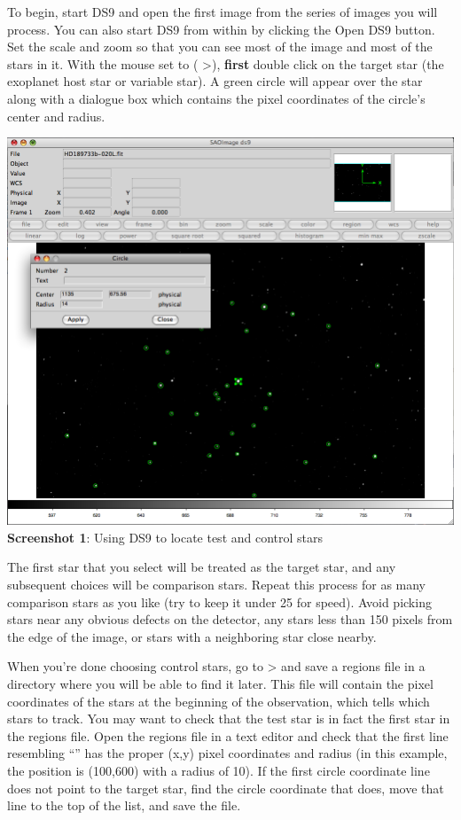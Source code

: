 \documentclass{article}
\begin{document}
To begin, start DS9 and open the first image from the series of images you will process. You can also start DS9 from within \oscaar by clicking the Open DS9 button. Set the scale and zoom so that you can see most of the image and most of the stars in it. With the mouse set to  ( \textgreater  {}), \textbf{first} double click on the target star (the exoplanet host star or variable star). A green circle will appear over the star along with a dialogue box which contains the pixel coordinates of the circle's center and radius. 
\begin{center}
\includegraphics[scale=0.34]{imgs/ds9.png}
{\small \textbf{Screenshot 1}: Using DS9 to locate test and control stars}
\end{center}	
The first star that you select will be treated as the target star, and any subsequent choices will be comparison stars. Repeat this process for as many comparison stars as you like (try to keep it under 25 for speed). Avoid picking stars near any obvious defects on the detector, any stars less than 150 pixels from the edge of the image, or stars with a neighboring star close nearby. 

When you're done choosing control stars, go to  \textgreater  {} and save a regions file in a directory where you will be able to find it later. This file will contain the pixel coordinates of the stars at the beginning of the observation, which tells \oscaar which stars to track. You may want to check that the test star is in fact the first star in the regions file. Open the regions file in a text editor and check that the first line resembling ``'' has the proper (x,y) pixel coordinates and radius (in this example, the position is (100,600) with a radius of 10). If the first circle coordinate line does not point to the target star, find the circle coordinate that does, move that line to the top of the list, and save the file.
\end{document}
